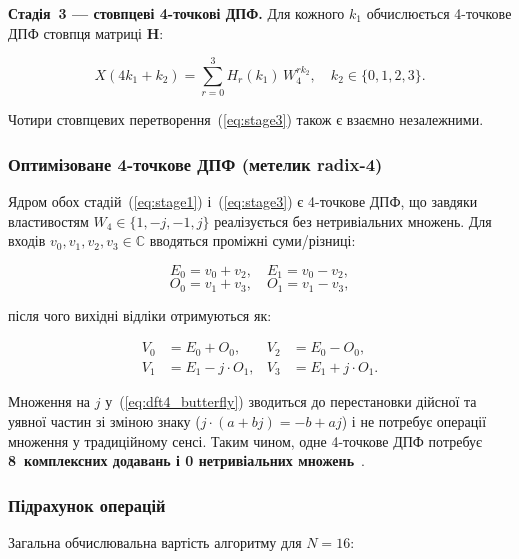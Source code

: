 \textbf{Стадія~3 --- стовпцеві 4-точкові ДПФ.}
Для кожного $k_1$ обчислюється 4-точкове ДПФ стовпця матриці
$\mathbf{H}$:

\begin{equation}
  X(4k_1 + k_2) = \sum_{r=0}^{3} H_r(k_1)\, W_4^{r k_2},
  \quad k_2 \in \{0,1,2,3\}.
  \label{eq:stage3}
\end{equation}

Чотири стовпцевих перетворення~(\ref{eq:stage3}) також є взаємно
незалежними.

\subsubsection*{Оптимізоване 4-точкове ДПФ (метелик radix-4)}

Ядром обох стадій~(\ref{eq:stage1}) і~(\ref{eq:stage3}) є 4-точкове
ДПФ, що завдяки властивостям $W_4 \in \{1, -j, -1, j\}$ реалізується
без нетривіальних множень. Для входів $v_0, v_1, v_2, v_3 \in \mathbb{C}$
вводяться проміжні суми/різниці:

\begin{equation*}
  E_0 = v_0 + v_2, \quad E_1 = v_0 - v_2,
\end{equation*}
\begin{equation*}
  O_0 = v_1 + v_3, \quad O_1 = v_1 - v_3,
\end{equation*}

після чого вихідні відліки отримуються як:

\begin{equation}
  \begin{aligned}
    V_0 &= E_0 + O_0, & V_2 &= E_0 - O_0, \\
    V_1 &= E_1 - j \cdot O_1, & V_3 &= E_1 + j \cdot O_1.
  \end{aligned}
  \label{eq:dft4_butterfly}
\end{equation}

Множення на $j$ у~(\ref{eq:dft4_butterfly}) зводиться до перестановки
дійсної та уявної частин зі зміною знаку
($j \cdot (a + bj) = -b + aj$) і не потребує операції множення у
традиційному сенсі. Таким чином, одне 4-точкове ДПФ потребує
\textbf{8~комплексних додавань і 0 нетривіальних
множень}~\cite{nussbaumer1982}.

\subsubsection*{Підрахунок операцій}

Загальна обчислювальна вартість алгоритму для $N = 16$:

